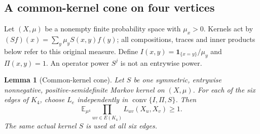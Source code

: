 \documentclass[a4paper,11pt,reqno]{amsart}
\theoremstyle{plain}
\newtheorem{lemma}[theorem]{Lemma}
\theoremstyle{definition}
\theoremstyle{remark}
\begin{document}
\subsection{A common-kernel cone on four vertices}

Let $(X,\mu)$ be a nonempty finite probability space with $\mu_x>0$.
Kernels act by $(Sf)(x)=\sum_y\mu_yS(x,y)f(y)$; all compositions, traces
and inner products below refer to this original measure.  Define
$I(x,y)=\mathbf1_{\{x=y\}}/\mu_y$ and $\Pi(x,y)=1$.
An operator power $S^j$ is not an entrywise power.

\begin{lemma}[Common-kernel cone]\label{lemma-common-kernel-cone}
Let $S$ be one symmetric, entrywise nonnegative, positive-semidefinite
Markov kernel on $(X,\mu)$.  For each of the six edges of $K_4$, choose
$L_e$ independently in $\operatorname{conv}\{I,\Pi,S\}$.
Then
\[
 \mathbb E_{\mu^4}\prod_{uv\in E(K_4)}L_{uv}(X_u,X_v)\ge1.
\]
The same actual kernel $S$ is used at all six edges.
\end{lemma}
\end{document}
